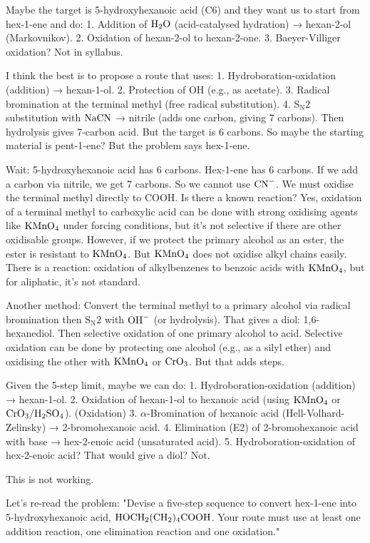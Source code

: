 \documentclass[11pt]{article}
\begin{document}
\begin{corrige}
\begin{enumerate}
Maybe the target is 5-hydroxyhexanoic acid (C6) and they want us to start from hex-1-ene and do:
1. Addition of \(\ce{H2O}\) (acid-catalysed hydration) → hexan-2-ol (Markovnikov).
2. Oxidation of hexan-2-ol to hexan-2-one.
3. Baeyer-Villiger oxidation? Not in syllabus.

I think the best is to propose a route that uses:
1. Hydroboration-oxidation (addition) → hexan-1-ol.
2. Protection of OH (e.g., as acetate).
3. Radical bromination at the terminal methyl (free radical substitution).
4. \(\mathrm{S_N2}\) substitution with \(\ce{NaCN}\) → nitrile (adds one carbon, giving 7 carbons). Then hydrolysis gives 7-carbon acid. But the target is 6 carbons. So maybe the starting material is pent-1-ene? But the problem says hex-1-ene.

Wait: 5-hydroxyhexanoic acid has 6 carbons. Hex-1-ene has 6 carbons. If we add a carbon via nitrile, we get 7 carbons. So we cannot use \(\ce{CN-}\). We must oxidise the terminal methyl directly to COOH. Is there a known reaction? Yes, oxidation of a terminal methyl to carboxylic acid can be done with strong oxidising agents like \(\ce{KMnO4}\) under forcing conditions, but it's not selective if there are other oxidisable groups. However, if we protect the primary alcohol as an ester, the ester is resistant to \(\ce{KMnO4}\). But \(\ce{KMnO4}\) does not oxidise alkyl chains easily. There is a reaction: oxidation of alkylbenzenes to benzoic acids with \(\ce{KMnO4}\), but for aliphatic, it's not standard.

Another method: Convert the terminal methyl to a primary alcohol via radical bromination then \(\mathrm{S_N2}\) with \(\ce{OH-}\) (or hydrolysis). That gives a diol: 1,6-hexanediol. Then selective oxidation of one primary alcohol to acid. Selective oxidation can be done by protecting one alcohol (e.g., as a silyl ether) and oxidising the other with \(\ce{KMnO4}\) or \(\ce{CrO3}\). But that adds steps.

Given the 5-step limit, maybe we can do:
1. Hydroboration-oxidation (addition) → hexan-1-ol.
2. Oxidation of hexan-1-ol to hexanoic acid (using \(\ce{KMnO4}\) or \(\ce{CrO3}/\ce{H2SO4}\)). (Oxidation)
3. \(\alpha\)-Bromination of hexanoic acid (Hell-Volhard-Zelinsky) → 2-bromohexanoic acid.
4. Elimination (E2) of 2-bromohexanoic acid with base → hex-2-enoic acid (unsaturated acid).
5. Hydroboration-oxidation of hex-2-enoic acid? That would give a diol? Not.

This is not working.

Let's re-read the problem: "Devise a five-step sequence to convert hex-1-ene into 5-hydroxyhexanoic acid, \(\ce{HOCH2(CH2)4COOH}\). Your route must use at least one addition reaction, one elimination reaction and one oxidation."


\end{enumerate}
\end{corrige}
\end{document}
